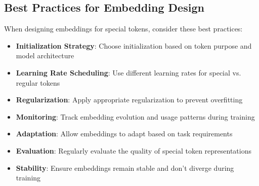 \subsection{Best Practices for Embedding Design}

When designing embeddings for special tokens, consider these best practices:

\begin{itemize}
\item \textbf{Initialization Strategy}: Choose initialization based on token purpose and model architecture
\item \textbf{Learning Rate Scheduling}: Use different learning rates for special vs. regular tokens
\item \textbf{Regularization}: Apply appropriate regularization to prevent overfitting
\item \textbf{Monitoring}: Track embedding evolution and usage patterns during training
\item \textbf{Adaptation}: Allow embeddings to adapt based on task requirements
\item \textbf{Evaluation}: Regularly evaluate the quality of special token representations
\item \textbf{Stability}: Ensure embeddings remain stable and don't diverge during training
\end{itemize}